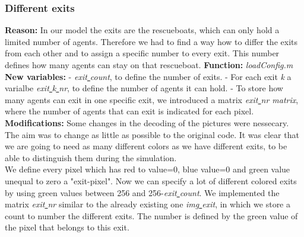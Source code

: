 \documentclass[11pt]{article}
\begin{document}
\subsubsection{Different exits}
\textbf{Reason:}
\newline
In our model the exits are the rescueboats, which can only hold a limited number of agents. Therefore we had to find a way how to differ the exits from each other and to assign a specific number to every exit. This number defines how many agents can stay on that rescueboat.
\newline
\textbf{Function:}
\newline
\textit{loadConfig.m}
\newline
\textbf{New variables:}
\newline
- \textit{exit\underline{ }count}, to define the number of exits.\newline
- For each exit \textit{k} a varialbe \textit{exit\underline{ }k\underline{ }nr}, to define the number of agents it can hold.\newline
- To store how many agents can exit in one specific exit, we introduced a matrix \textit{exit\underline{ }nr matrix}, where the number of agents that can exit is indicated for each pixel.
\newline
\textbf{Modifications:}
\newline 
Some changes in the decoding of the pictures were nessecary. The aim was to change as little as possible to the original code. It was clear that we are going to need as many different colors as we have different exits, to be able to distinguish them during the simulation.
\\
We define every pixel which has red to value=0, blue value=0 and green value unequal to zero a "exit-pixel". Now we can specify a lot of different colored exits by using green values between 256 and 256-\textit{exit\underline{ }count}.
\newline
We implemented the matrix \textit{exit\underline{ }nr} similar to the already existing one \textit{img\underline{ }exit}, in which we store a count to number the different exits. The number is defined by the green value of the pixel that belongs to this exit.

\end{document}

